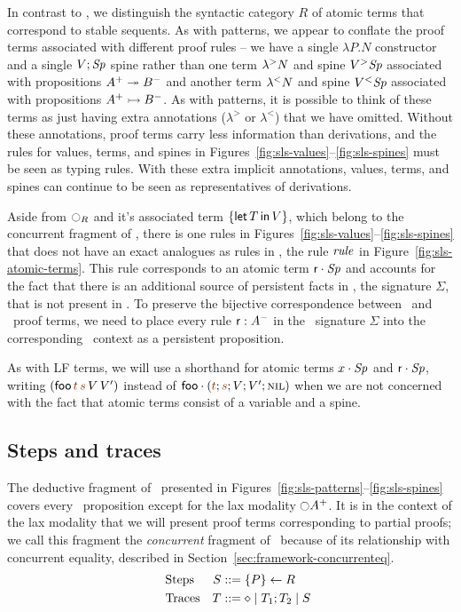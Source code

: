 In contrast to \ollll, we distinguish the syntactic category $R$ of
atomic terms that correspond to stable sequents. As with patterns, we
appear to conflate the proof terms associated with different proof
rules -- we have a single $\lambda P.N$ constructor and a single
$V;{\it Sp}$ spine rather than one term ${\lambda}^{>}{N}$ and spine
${V}{^{>}}{{\it Sp}}$ associated with propositions $A^+ \twoheadrightarrow B^-$ and
another term ${\lambda}^{<}{N}$ and spine ${V}{^{<}}{{\it Sp}}$ associated with
propositions $A^+ \rightarrowtail B^-$.  As with patterns, it is possible to
think of these terms as just having extra annotations ($\lambda^>$ or
$\lambda^<$) that we have omitted.  Without these annotations, proof
terms carry less information than derivations, and the rules for
values, terms, and spines in
Figures~\ref{fig:sls-values}--\ref{fig:sls-spines} must be seen as
typing rules. With these extra implicit annotations, values, terms,
and spines can continue to be seen as representatives of derivations.



Aside from ${\ocircle}_R$ and it's associated term $\{{\sf let}\,{T}\,{\sf in}\, {V} \}$,
which belong to the concurrent fragment of \sls, there is one rules in
Figures~\ref{fig:sls-values}--\ref{fig:sls-spines} that does not have
an exact analogues as rules in \ollll, the rule ${\it rule}$ in
Figure~\ref{fig:sls-atomic-terms}. This rule corresponds to an atomic
term ${\sf r} \cdot {{\it Sp}}$ and accounts for the fact that there is an
additional source of persistent facts in \sls, the signature $\Sigma$,
that is not present in \ollll.  To preserve the bijective
correspondence between \ollll~and \sls~proof terms, we need to place
every rule ${\sf r} : A^-$ in the \sls~signature $\Sigma$ into the
corresponding \ollll~context as a persistent proposition.

As with LF terms, we will use a shorthand for atomic terms
${x} \cdot {{\it Sp}}$ and ${\sf r} \cdot {{\it Sp}}$, writing $({\sf
  foo}\,\lf{t}\,\lf{s}\,V\,V')$ instead of $\tfocusl{\sf
  foo}{(\lf{t};\lf{s};V;V';\tnil)}$ when we are not concerned with the
fact that atomic terms consist of a variable and a spine.

\subsection{Steps and traces}
\label{sec:framework-concurrent}
\label{sec:framework-substprop}

The deductive fragment of \sls~presented in
Figures~\ref{fig:sls-patterns}--\ref{fig:sls-spines} covers every
\sls~proposition except for the lax modality ${\ocircle}A^+$. It is in
the context of the lax modality that we will present proof terms
corresponding to partial proofs; we call this fragment the {\it
  concurrent} fragment of \sls~because of its relationship with
concurrent equality, described in
Section~\ref{sec:framework-concurrenteq}.
\begin{align*}
\qquad\qquad\qquad\qquad
&\mbox{Steps}&
S & ::= \{{P}\} \leftarrow {R}
\qquad\qquad\qquad\qquad
\\
&\mbox{Traces}&
T & ::= \diamond \mid T_1; T_2 \mid S
\end{align*}

